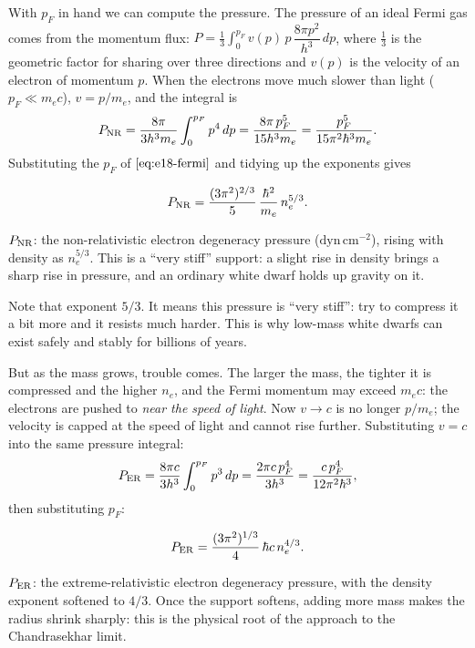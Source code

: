 With \(p_F\) in hand we can compute the pressure. The pressure of an ideal Fermi gas comes from the momentum flux: \(P=\tfrac13\int_0^{p_F} v(p)\,p\,\dfrac{8\pi p^2}{h^3}\,dp\), where \(\tfrac13\) is the geometric factor for sharing over three directions and \(v(p)\) is the velocity of an electron of momentum \(p\). When the electrons move much slower than light (\(p_F\ll m_ec\)), \(v=p/m_e\), and the integral is
\[
  P_{\rm NR}=\frac{8\pi}{3h^3m_e}\int_0^{p_F}p^4\,dp
           =\frac{8\pi\,p_F^5}{15h^3m_e}
           =\frac{p_F^5}{15\pi^2\hbar^3 m_e}.
\]
Substituting the \(p_F\) of \(\eqref{eq:e18-fermi}\) and tidying up the exponents gives

\begin{equation}
  P_{\rm NR}=\frac{(3\pi^2)^{2/3}}{5}\,
             \frac{\hbar^2}{m_e}\,n_e^{5/3}.
  \label{eq:e18-pnr}
\end{equation}
\begin{formulaexplain}
\(P_{\rm NR}\): the non-relativistic electron degeneracy pressure (\(\mathrm{dyn\,cm^{-2}}\)), rising with density as \(n_e^{5/3}\). This is a ``very stiff'' support: a slight rise in density brings a sharp rise in pressure, and an ordinary white dwarf holds up gravity on it.
\end{formulaexplain}

Note that exponent \(5/3\). It means this pressure is ``very stiff'': try to compress it a bit more and it resists much harder. This is why low-mass white dwarfs can exist safely and stably for billions of years.

But as the mass grows, trouble comes. The larger the mass, the tighter it is compressed and the higher \(n_e\), and the Fermi momentum may exceed \(m_ec\): the electrons are pushed to \emph{near the speed of light}. Now \(v\to c\) is no longer \(p/m_e\); the velocity is capped at the speed of light and cannot rise further. Substituting \(v=c\) into the same pressure integral:
\[
  P_{\rm ER}=\frac{8\pi c}{3h^3}\int_0^{p_F}p^3\,dp
           =\frac{2\pi c\,p_F^4}{3h^3}
           =\frac{c\,p_F^4}{12\pi^2\hbar^3},
\]
then substituting \(p_F\):

\begin{equation}
  P_{\rm ER}=\frac{(3\pi^2)^{1/3}}{4}\,\hbar c\,n_e^{4/3}.
  \label{eq:e18-per}
\end{equation}
\begin{formulaexplain}
\(P_{\rm ER}\): the extreme-relativistic electron degeneracy pressure, with the density exponent softened to \(4/3\). Once the support softens, adding more mass makes the radius shrink sharply: this is the physical root of the approach to the Chandrasekhar limit.
\end{formulaexplain}

